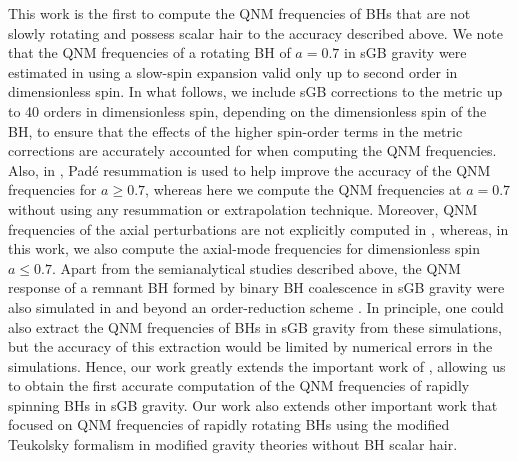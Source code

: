 \documentclass[aps,prx,amsmath,floats,floatfix,twocolumn,
  superscriptaddress,nofootinbib,showpacs]{revtex4-1}
\begin{document}
This work is the first to compute the QNM frequencies of BHs that are not slowly rotating and possess scalar hair to the accuracy described above. 
We note that the QNM frequencies of a rotating BH of $a=0.7$ in sGB gravity were estimated in \cite{Pierini:2022eim} using a slow-spin expansion valid only up to second order in dimensionless spin. 
In what follows, we include sGB corrections to the metric up to 40 orders in dimensionless spin, depending on the dimensionless spin of the BH, to ensure that the effects of the higher spin-order terms in the metric corrections are accurately accounted for when computing the QNM frequencies. 
Also, in \cite{Pierini:2022eim}, Pad\'e resummation is used to help improve the accuracy of the QNM frequencies for $a \geq 0.7$, whereas here we compute the QNM frequencies at $a=0.7$ without using any resummation or extrapolation technique. 
Moreover, QNM frequencies of the axial perturbations are not explicitly computed in \cite{Pierini:2022eim}, whereas, in this work, we also compute the axial-mode frequencies for dimensionless spin $a \leq 0.7$. 
Apart from the semianalytical studies described above, the QNM response of a remnant BH formed by binary BH coalescence in sGB gravity were also simulated in \cite{Okounkova:2019dfo, Okounkova:2019zjf, Okounkova:2020rqw} and beyond an order-reduction scheme \cite{AresteSalo:2022hua, AresteSalo:2023mmd}. 
In principle, one could also extract the QNM frequencies of BHs in sGB gravity from these simulations, but the accuracy of this extraction would be limited by numerical errors in the simulations.
Hence, our work greatly extends the important work of \cite{Pierini:2022eim,Okounkova:2019dfo, Okounkova:2019zjf, Okounkova:2020rqw,AresteSalo:2022hua, AresteSalo:2023mmd}, allowing us to obtain the first accurate computation of the QNM frequencies of rapidly spinning BHs in sGB gravity. 
Our work also extends other important work that focused on QNM frequencies of rapidly rotating BHs using the modified Teukolsky formalism \cite{Cano:2023jbk, Cano:2020cao, Cano:2021myl, Cano:2023tmv} in modified gravity theories without BH scalar hair.
\end{document}
